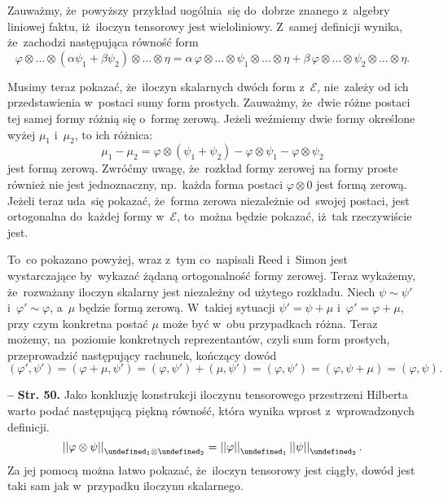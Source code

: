 \documentclass[a4paper,11pt]{article}
\newcommand{\ld}{\ldots}
\newcommand{\mc}{\mathcal}
\newcommand{\al}{\alpha}
\newcommand{\vp}{\varphi}
\let\H\undefined
\newcommand{\H}{\mc{H}}
\newcommand{\ot}{\otimes}
\newcommand{\norm}[1]{\left|\left| #1 \right|\right|}
\newcommand{\tb}{\textbf}
\newcommand{\noi}{\noindent}
\newcommand{\start}{\noi \tb{--} {}}
\newcommand{\Str}[1]{\tb{Str. #1.}}
\begin{document}
Zauważmy, że~powyższy przykład uogólnia~się do~dobrze znanego
z~algebry liniowej faktu, iż~iloczyn tensorowy jest wieloliniowy.
Z~samej definicji wynika, że~zachodzi następująca równość form
\begin{displaymath}
  \vp \ot \ld \ot ( \al \psi_{ 1 } + \beta \psi_{ 2 } ) \ot \ld \ot \eta
  = \al \, \vp \ot \ld \ot \psi_{ 1 } \ot \ld \ot \eta
  + \beta \, \vp \ot \ld \ot \psi_{ 2 } \ot \ld \ot \eta.
\end{displaymath}

Musimy teraz pokazać, że~iloczyn skalarnych dwóch form z~$\mc{E}$,
nie~zależy od ich przedstawienia w~postaci sumy form prostych.
Zauważmy, że~dwie różne postaci tej samej formy różnią się o~formę
zerową. Jeżeli weźmiemy dwie formy określone wyżej $\mu_{ 1 }$
i~$\mu_{ 2 }$, to ich różnica:
\begin{displaymath}
  \mu_{ 1 } - \mu_{ 2 } = \vp \ot ( \psi_{ 1 } + \psi_{ 2 } )
  - \vp \ot \psi_{ 1 } - \vp \ot \psi_{ 2 }
\end{displaymath}
jest formą zerową. Zwróćmy uwagę, że~rozkład formy zerowej na formy
proste również nie jest jednoznaczny, np.~każda forma postaci
$\vp \ot 0$ jest formą zerową. Jeżeli teraz uda~się pokazać, że~forma
zerowa niezależnie od~swojej postaci, jest ortogonalna do~każdej formy
w~$\mc{E}$, to~można będzie pokazać, iż~tak rzeczywiście jest.

To~co pokazano powyżej, wraz z~tym co~napisali Reed i~Simon jest
wystarczające by~wykazać żądaną ortogonalność formy zerowej. Teraz
wykażemy, że~rozważany iloczyn skalarny jest niezależny od użytego
rozkładu. Niech $\psi \sim \psi'$ i~$\vp' \sim \vp$, a~$\mu$ będzie
formą zerową. W~takiej sytuacji $\psi' = \psi + \mu$
i~$\vp' = \vp + \mu$, przy czym konkretna postać $\mu$ może być w~obu
przypadkach różna. Teraz możemy, na~poziomie konkretnych
reprezentantów, czyli sum form prostych, przeprowadzić następujący
rachunek, kończący dowód
\begin{displaymath}
  ( \vp', \psi' ) = ( \vp + \mu, \psi' ) = ( \vp, \psi' ) + ( \mu, \psi' )
  = ( \vp, \psi' ) = ( \vp, \psi + \mu ) = ( \vp, \psi ).
\end{displaymath}

\start \Str{50} Jako konkluzję konstrukcji iloczynu tensorowego
przestrzeni Hilberta warto podać następującą piękną równość, która
wynika wprost z~wprowadzonych definicji.
\begin{displaymath}
  \norm{ \vp \ot \psi }_{ \H_{ 1 } \ot \H_{ 2 } }
  = \norm{ \vp }_{ \H_{ 1 } } \norm{ \psi }_{ \H_{ 2 } }.
\end{displaymath}
Za jej pomocą można łatwo pokazać, że~iloczyn tensorowy jest ciągły,
dowód jest taki sam jak w~przypadku iloczynu skalarnego.
\end{document}
